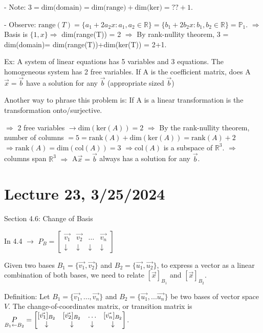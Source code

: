 \documentclass{article}
\begin{document}
- Note: $3 = \text{dim(domain)} = \text{dim(range)} + \text{dim(ker)} = ?? + 1$.
  
- Observe: $\text{range}(T) = \{a_1 + 2a_2x : a_1, a_2 \in \mathbb{R}\} = \{b_1 + 2b_2x : b_1, b_2 \in \mathbb{R}\} = \mathbb{P}_1$. 
  $\Rightarrow$ Basis is $\{1, x\} \Rightarrow$ dim(range(T)) = 2 $\Rightarrow$ By rank-nullity theorem, 3 = dim(domain)= dim(range(T))+dim(ker(T)) = 2+1.

Ex: A system of linear equations has 5 variables and 3 equations. The homogeneous system has 2 free variables. If A is the coefficient matrix, does A$\vec{x} = \vec{b}$ have a solution for any $\vec{b}$ (appropriate sized $\vec{b}$)

Another way to phrase this problem is: If A is a linear transformation is the transformation onto/surjective.

$\Rightarrow$ 2 free variables $\rightarrow \text{dim}(\text{ker}(A)) = 2$ 
$\Rightarrow$ By the rank-nullity theorem, number of columns $= 5 = \text{rank}(A) + \text{dim}(\text{ker}(A)) = \text{rank}(A) + 2$ 
$\Rightarrow \text{rank}(A) = \text{dim}(\text{col}(A)) = 3$ 
$\Rightarrow \text{col}(A)$ is a subspace of $\mathbb{R}^3$. $\Rightarrow$ columns span $\mathbb{R}^3$ $\Rightarrow$ A$\vec{x} = \vec{b}$ always has a solution for any $\vec{b}$.



\section{Lecture 23, 3/25/2024}

Section 4.6: Change of Basis

In 4.4 $\rightarrow$ \(P_B = \begin{bmatrix} \vec{v_1} & \vec{v_2} & \ldots & \vec{v_n} \\ \downarrow & \downarrow & \downarrow & \downarrow \end{bmatrix}\)

Given two bases $B_1=\{\vec{v_1}, \vec{v_2}\}$ and $B_2=\{\vec{u_1}, \vec{u_2}\}$, to express a vector as a linear combination of both bases, we need to relate $[\vec{x}]_{B_1}$ and $[\vec{x}]_{B_2}$.

Definition: Let $B_1=\{\vec{v_1}, ..., \vec{v_n}\}$ and $B_2 = \{\vec{u_1}, ... \vec{u_n}\}$ be two bases of vector space $V$. The change-of-coordinates matrix, or transition matrix is $\underset{B_1 \leftarrow B_2}{\large P} = \begin{bmatrix} [\vec{v_1}]_{B_2} & [\vec{v_2}]_{B_2} & \ldots & [\vec{v_n}]_{B_2} \\ \downarrow & \downarrow & \downarrow & \downarrow \end{bmatrix}$.
\end{document}
